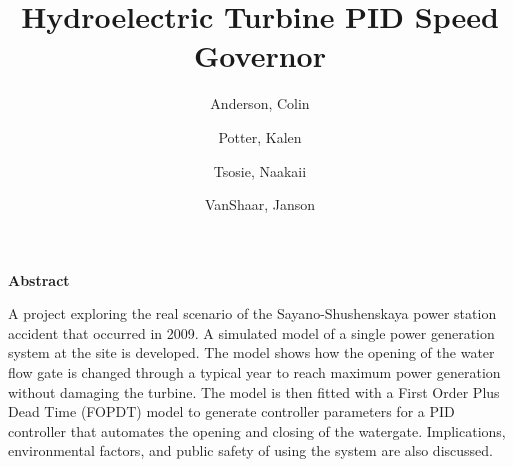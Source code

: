 \documentclass{article}
\title{Hydroelectric Turbine PID Speed Governor}
\author{
    Anderson, Colin
    \and
    Potter, Kalen
    \and
    Tsosie, Naakaii
    \and
    VanShaar, Janson
}
\date{}
\begin{document}
    \maketitle

    \thispagestyle{plain}
    
    \noindent\makebox[\linewidth]{\rule{\textwidth}{0.4pt}}

    \begin{center}
        \textbf{Abstract}
    \end{center}


    A project exploring the real scenario of the Sayano-Shushenskaya power station accident that occurred in 2009.  A simulated model of a single power generation system at the site is developed. The model shows how the opening of the water flow gate is changed through a typical year to reach maximum power generation without damaging the turbine.  The model is then fitted with a First Order Plus Dead Time (FOPDT) model to generate controller parameters for a PID controller that automates the opening and closing of the watergate.  Implications, environmental factors, and public safety of using the system are also discussed.

    \noindent\makebox[\linewidth]{\rule{\textwidth}{0.4pt}}
\end{document}
